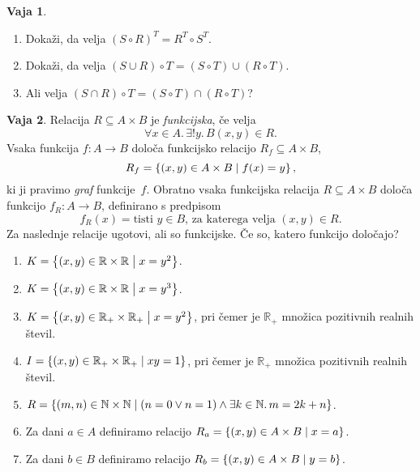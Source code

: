 \documentclass{article}
\newcommand{\all}[1]{\forall #1 .\,}
\newcommand{\some}[1]{\exists #1 .\,}
\newcommand{\exactlyone}[1]{\exists{!} #1 .\,}
\newcommand{\NN}{\mathbb{N}}
\newcommand{\RR}{\mathbb{R}}
\theoremstyle{definition}
\newtheorem{vaja}{Vaja}
\begin{document}
\begin{vaja}
\begin{enumerate}
  \item Dokaži, da velja $(S \circ R)^T = R^T \circ S^T$.

  \item Dokaži, da velja $(S \cup R) \circ T = (S \circ T) \cup (R
  \circ T)$.

  \item Ali velja $(S \cap R) \circ T = (S \circ T) \cap (R
  \circ T)$?
\end{enumerate}
\end{vaja}

\begin{vaja}
  Relacija $R \subseteq A \times B$ je \emph{funkcijska}, če velja
  \begin{equation*}
    \all{x \in A}{\exactlyone{y}{B}{(x,y) \in R}}.
  \end{equation*}
  Vsaka funkcija $f : A \to B$ določa funkcijsko relacijo $R_f
  \subseteq A \times B$,
  \begin{equation*}
    R_f = \set{(x,y) \in A \times B}{f(x) = y},
  \end{equation*}
  ki ji pravimo \emph{graf} funkcije~$f$. Obratno vsaka funkcijska
  relacija $R \subseteq A \times B$ določa funkcijo $f_R : A \to B$,
  definirano s predpisom
  \begin{equation*}
    f_R(x) = \text{tisti $y \in B$, za katerega velja $(x,y) \in R$}.
  \end{equation*}
  Za naslednje relacije ugotovi, ali so funkcijske. Če so, katero
  funkcijo določajo?
\begin{enumerate}
  \item $K = \set{(x,y) \in \RR \times \RR}{x = y^2}$.

  \item $K = \set{(x,y) \in \RR \times \RR}{x = y^3}$.

  \item $K = \set{(x,y) \in \RR_{+} \times \RR_{+}}{x =
    y^2}$, pri čemer je $\RR_{+}$ množica pozitivnih realnih števil.

  \item $I = \set{(x,y) \in \RR_{+} \times \RR_{+}}{x y =
    1}$, pri čemer je $\RR_{+}$ množica pozitivnih realnih števil.

  \item $R = \set{(m,n) \in \NN \times \NN}{(n = 0 \lor n = 1) \land \some{k \in \NN}{m = 2 k + n}}$.

  \item Za dani $a \in A$ definiramo relacijo $R_a = \set{(x,y)
    \in A \times B}{x = a}$.


  \item Za dani $b \in B$ definiramo relacijo $R_b = \set{(x,y)
    \in A \times B}{y = b}$.
\end{enumerate}
\end{vaja}
\end{document}
